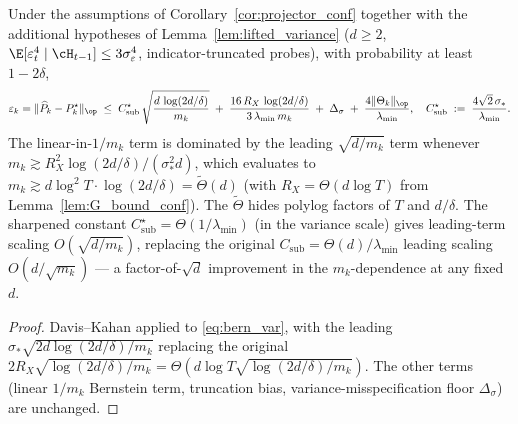 \begin{corollary}
\label{cor:projector_var}
Under the assumptions of Corollary~\ref{cor:projector_conf} together
with the additional hypotheses of Lemma~\ref{lem:lifted_variance}
($d\ge 2$, $\E[\varepsilon_t^4\mid\cH_{t-1}]\le 3\sigma_\varepsilon^4$,
indicator-truncated probes), with probability at least $1-2\delta$,
\begin{equation}
\varepsilon_k = \|\widehat P_k - P_k^\star\|_\op
\;\le\; C_{\mathrm{sub}}^\star\,\sqrt{\frac{d\,\log(2d/\delta)}{m_k}}
\;+\;\frac{16\,R_X\,\log(2d/\delta)}{3\,\lambda_{\min}\,m_k}
\;+\;\Delta_\sigma\;+\;\frac{4\|\Theta_k\|_\op}{\lambda_{\min}},
\quad
C_{\mathrm{sub}}^\star \;:=\;\frac{4\sqrt{2}\,\sigma_*}{\lambda_{\min}}.
\label{eq:proj_bound_var}
\end{equation}
The linear-in-$1/m_k$ term is dominated by the leading
$\sqrt{d/m_k}$ term whenever $m_k\gtrsim R_X^2\log(2d/\delta)/(\sigma_*^2 d)$,
which evaluates to $m_k\gtrsim d\log^2 T\cdot\log(2d/\delta) = \tilde\Theta(d)$
(with $R_X=\Theta(d\log T)$ from Lemma~\ref{lem:G_bound_conf}). The
$\tilde\Theta$ hides polylog factors of $T$ and $d/\delta$.
The sharpened constant $C_{\mathrm{sub}}^\star = \Theta(1/\lambda_{\min})$
(in the variance scale) gives leading-term scaling
$O(\sqrt{d/m_k})$, replacing the original
$C_{\mathrm{sub}}=\Theta(d)/\lambda_{\min}$ leading scaling
$O(d/\sqrt{m_k})$ — a factor-of-$\sqrt d$ improvement in the
$m_k$-dependence at any fixed $d$.
\end{corollary}
\begin{proof}
Davis--Kahan applied to \eqref{eq:bern_var}, with the leading
$\sigma_*\sqrt{2d\log(2d/\delta)/m_k}$ replacing the original
$2R_X\sqrt{\log(2d/\delta)/m_k}=\Theta(d\log T\sqrt{\log(2d/\delta)/m_k})$.
The other terms (linear $1/m_k$ Bernstein term, truncation bias,
variance-misspecification floor $\Delta_\sigma$) are unchanged.
\end{proof}


